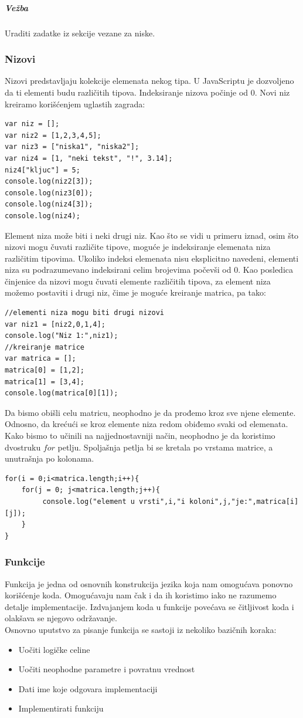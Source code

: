 \documentclass[a4paper]{article}
\begin{document}
\subparagraph{Vežba}
Uraditi zadatke iz sekcije vezane za niske.

\subsubsection{Nizovi}
Nizovi predstavljaju kolekcije elemenata nekog tipa. U JavaScriptu je dozvoljeno da ti elementi budu različitih tipova. Indeksiranje nizova počinje od 0. Novi niz kreiramo korišćenjem uglastih zagrada:
\begin{verbatim}
var niz = [];
var niz2 = [1,2,3,4,5];
var niz3 = ["niska1", "niska2"];
var niz4 = [1, "neki tekst", "!", 3.14];
niz4["kljuc"] = 5;
console.log(niz2[3]);
console.log(niz3[0]);
console.log(niz4[3]);
console.log(niz4);
\end{verbatim}
Element niza može biti i neki drugi niz. Kao što se vidi u primeru iznad, osim što nizovi mogu čuvati različite tipove, moguće je indeksiranje elemenata niza različitim tipovima. Ukoliko indeksi elemenata nisu eksplicitno navedeni, elementi niza su podrazumevano indeksirani celim brojevima počevši od 0. Kao posledica činjenice da nizovi mogu čuvati elemente različitih tipova, za element niza možemo postaviti i drugi niz, čime je moguće kreiranje matrica, pa tako:
\begin{verbatim}
//elementi niza mogu biti drugi nizovi
var niz1 = [niz2,0,1,4];
console.log("Niz 1:",niz1);
//kreiranje matrice
var matrica = [];
matrica[0] = [1,2];
matrica[1] = [3,4];
console.log(matrica[0][1]);
\end{verbatim}
Da bismo obišli celu matricu, neophodno je da prođemo kroz sve njene elemente. Odnosno, da krećući se kroz elemente niza redom obiđemo svaki od elemenata. Kako bismo to učinili na najjednostavniji način, neophodno je da koristimo dvostruku $for$ petlju. Spoljašnja petlja bi se kretala po vrstama matrice, a unutrašnja po kolonama. 
\begin{verbatim}
for(i = 0;i<matrica.length;i++){
    for(j = 0; j<matrica.length;j++){
         console.log("element u vrsti",i,"i koloni",j,"je:",matrica[i][j]);
    }
}
\end{verbatim}

\subsubsection{Funkcije}
Funkcija je jedna od osnovnih konstrukcija jezika koja nam omogućava ponovno korišćenje koda. Omogućavaju nam čak i da ih koristimo iako ne razumemo detalje implementacije. Izdvajanjem koda u funkcije povećava se čitljivost koda i olakšava se njegovo održavanje.   
\\
Osnovno uputstvo za pisanje funkcija se sastoji iz nekoliko bazičnih koraka:
\begin{itemize}
\item Uočiti logičke celine
\item Uočiti neophodne parametre i povratnu vrednost 
\item Dati ime koje odgovara implementaciji
\item Implementirati funkciju
\end{itemize}
\end{document}
